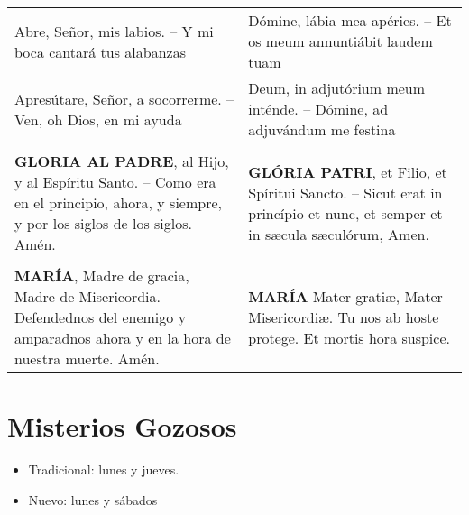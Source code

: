 \documentclass[./main.tex]{subfiles}
\newcounter{joyful-counter}
\begin{document}
\begin{longtable} {p{} p{} }
      Abre, Señor, mis labios. -- Y mi boca cantará tus alabanzas                                                           
    
            & 
    
      Dómine, lábia mea apéries. -- Et os meum annuntiábit laudem tuam\\
      Apresútare, Señor, a socorrerme. -- Ven, oh Dios, en mi ayuda                                                    
    
            & 
    
      Deum, in adjutórium meum inténde. -- Dómine, ad adjuvándum me festina\\\\

      \label{glory}
      \textbf{GLORIA AL PADRE}, al Hijo, y al Espíritu Santo. -- Como era en el principio, ahora, y siempre, y por los siglos de los siglos. Amén.                   
    
            & 

      \textbf{GLÓRIA PATRI}, et Filio, et Spíritui Sancto. -- Sicut erat in princípio et nunc, et semper et in sæcula sæculórum, Amen.\\\\
      
      \textbf{MARÍA}, Madre de gracia, Madre de Misericordia. Defendednos del enemigo y amparadnos ahora y en la hora de nuestra muerte. Amén.                               
    
            & 
    
      \textbf{MARÍA} Mater gratiæ, Mater Misericordiæ. Tu nos ab hoste protege. Et mortis hora suspice.

\end{longtable}

\section*{Misterios Gozosos}

\begin{itemize}
      \item Tradicional: lunes y jueves.
      \item Nuevo: lunes y sábados
\end{itemize}

\end{document}
